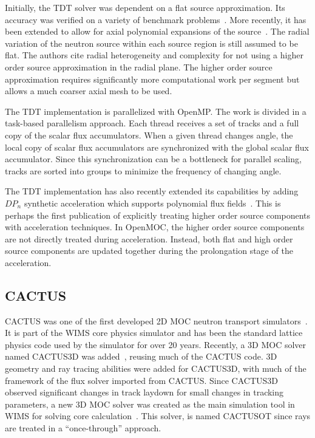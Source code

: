 Initially, the TDT solver was dependent on a flat source approximation. Its accuracy was verified on a variety of benchmark problems~\cite{apollo3_3dmoc, apollo3_vv}. More recently, it has been extended to allow for axial polynomial expansions of the source~\cite{apollo3_extruded}. The radial variation of the neutron source within each source region is still assumed to be flat. The authors cite radial heterogeneity and complexity for not using a higher order source approximation in the radial plane. The higher order source approximation requires significantly more computational work per segment but allows a much coarser axial mesh to be used. 

The TDT implementation is parallelized with OpenMP. The work is divided in a task-based parallelism approach. Each thread receives a set of tracks and a full copy of the scalar flux accumulators. When a given thread changes angle, the local copy of scalar flux accumulators are synchronized with the global scalar flux accumulator. Since this synchronization can be a bottleneck for parallel scaling, tracks are sorted into groups to minimize the frequency of changing angle.

The TDT implementation has also recently extended its capabilities by adding $DP_n$ synthetic acceleration which supports polynomial flux fields~\cite{apollo3_exp}. This is perhaps the first publication of explicitly treating higher order source components with acceleration techniques. In OpenMOC, the higher order source components are not directly treated during acceleration. Instead, both flat and high order source components are updated together during the prolongation stage of the acceleration.

\subsection{CACTUS}
\label{sec:cactus}

CACTUS was one of the first developed 2D \ac{MOC} neutron transport simulators~\cite{cactus_2d}. It is part of the WIMS core physics simulator and has been the standard lattice physics code used by the simulator for over 20 years. Recently, a 3D \ac{MOC} solver named CACTUS3D was added~\cite{cactus_3d}, reusing much of the CACTUS code. 3D geometry and ray tracing abilities were added for CACTUS3D, with much of the framework of the flux solver imported from CACTUS. Since CACTUS3D observed significant changes in track laydown for small changes in tracking parameters, a new 3D \ac{MOC} solver was created as the main simulation tool in WIMS for solving core calculation~\cite{cactus_wims}. This solver, is named  CACTUSOT since rays are treated in a ``once-through'' approach.

